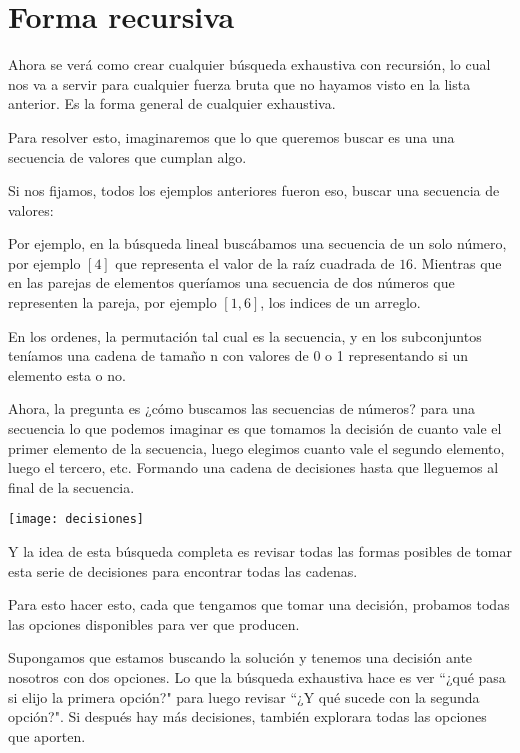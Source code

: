 \section{Forma recursiva}

Ahora se verá como crear cualquier búsqueda exhaustiva con recursión, lo cual nos va a servir para cualquier fuerza bruta que no hayamos visto en la lista anterior. Es la forma general de cualquier exhaustiva.

Para resolver esto, imaginaremos que lo que queremos buscar es una una secuencia de valores que cumplan algo. 

Si nos fijamos, todos los ejemplos anteriores fueron eso, buscar una secuencia de valores:

Por ejemplo, en la búsqueda lineal buscábamos una secuencia de un solo número, por ejemplo \([4]\) que representa el valor de la raíz cuadrada de \(16\). Mientras que en las parejas de elementos queríamos una secuencia de dos números que representen la pareja, por ejemplo \([1, 6]\), los indices de un arreglo.

En los ordenes, la permutación tal cual es la secuencia, y en los subconjuntos teníamos una cadena de tamaño n con valores de 0 o 1 representando si un elemento esta o no.

Ahora, la pregunta es ¿cómo buscamos las secuencias de números? para una secuencia lo que podemos imaginar es que tomamos la decisión de cuanto vale el primer elemento de la secuencia, luego elegimos cuanto vale el segundo elemento, luego el tercero, etc. Formando una cadena de decisiones hasta que lleguemos al final de la secuencia.

\begin{center}
	\texttt{[image: decisiones]}
\end{center}

Y la idea de esta búsqueda completa es revisar todas las formas posibles de tomar esta serie de decisiones para encontrar todas las cadenas. 

Para esto hacer esto, cada que tengamos que tomar una decisión, probamos todas las opciones disponibles para ver que producen.

Supongamos que estamos buscando la solución y tenemos una decisión ante nosotros con dos opciones. Lo que la búsqueda exhaustiva hace es ver ``¿qué pasa si elijo la primera opción?" para luego revisar ``¿Y qué sucede con la segunda opción?". Si después hay más decisiones, también explorara todas las opciones que aporten.

